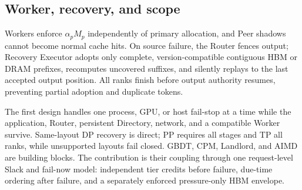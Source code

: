 \subsection{Worker, recovery, and scope}
\label{sec:worker-layer}
\label{sec:end-to-end}

Workers enforce $\alpha_pM_p$ independently of primary allocation, and Peer
shadows cannot become normal cache hits.  On source failure, the Router fences
output; Recovery Executor adopts only complete, version-compatible contiguous
HBM or DRAM prefixes, recomputes uncovered suffixes, and silently replays to
the last accepted output position.  All ranks finish before output authority
resumes, preventing partial adoption and duplicate tokens.

The first design handles one process, GPU, or host fail-stop at a time while
the application, Router, persistent Directory, network, and a compatible
Worker survive.  Same-layout DP recovery is direct; PP requires all stages and
TP all ranks, while unsupported layouts fail closed.  GBDT, CPM, Landlord, and
AIMD are building blocks.  The contribution is their coupling through one
request-level Slack and fail-now model: independent tier credits before
failure, due-time ordering after failure, and a separately enforced
pressure-only HBM envelope.
